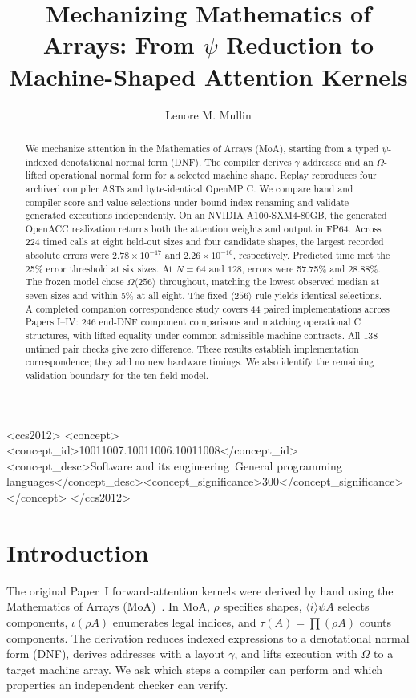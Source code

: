 \documentclass[sigplan,10pt,review,balance=false,pbalance=false]{acmart}
\title{Mechanizing Mathematics of Arrays: From \texorpdfstring{$\psi$}{Psi} Reduction to Machine-Shaped Attention Kernels}
\author{Lenore M. Mullin}
\affiliation{\department{College of Nanotechnology, Science and Engineering}\institution{University at Albany, SUNY}\city{Albany}\state{New York}\country{USA}}
\begin{document}
\begin{abstract}
We mechanize attention in the Mathematics of Arrays (MoA), starting from a typed $\psi$-indexed denotational normal form (DNF). The compiler derives $\gamma$ addresses and an $\Omega$-lifted operational normal form for a selected machine shape. Replay reproduces four archived compiler ASTs and byte-identical OpenMP C. We compare hand and compiler score and value selections under bound-index renaming and validate generated executions independently. On an NVIDIA A100-SXM4-80GB, the generated OpenACC realization returns both the attention weights and output in FP64. Across 224 timed calls at eight held-out sizes and four candidate shapes, the largest recorded absolute errors were $2.78\times10^{-17}$ and $2.26\times10^{-16}$, respectively. Predicted time met the 25\% error threshold at six sizes. At $N=64$ and $128$, errors were 57.75\% and 28.88\%. The frozen model chose $\Omega\langle256\rangle$ throughout, matching the lowest observed median at seven sizes and within 5\% at all eight. The fixed $\langle256\rangle$ rule yields identical selections. A completed companion correspondence study covers 44 paired implementations across Papers I--IV: 246 end-DNF component comparisons and matching operational C structures, with lifted equality under common admissible machine contracts. All 138 untimed pair checks give zero difference. These results establish implementation correspondence; they add no new hardware timings. We also identify the remaining validation boundary for the ten-field model.
\end{abstract}
\begin{CCSXML}
<ccs2012>
 <concept><concept_id>10011007.10011006.10011008</concept_id><concept_desc>Software and its engineering~General programming languages</concept_desc><concept_significance>300</concept_significance></concept>
</ccs2012>
\end{CCSXML}
\maketitle
\thispagestyle{plain}
\pagestyle{plain}
\section{Introduction}
The original Paper~I forward-attention kernels were derived by hand using the Mathematics of Arrays (MoA)~\cite{paperI,moa}. In MoA, $\rho$ specifies shapes, $\langle i\rangle\psi A$ selects components, $\iota(\rho A)$ enumerates legal indices, and $\tau(A)=\prod(\rho A)$ counts components. The derivation reduces indexed expressions to a denotational normal form (DNF), derives addresses with a layout $\gamma$, and lifts execution with $\Omega$ to a target machine array. We ask which steps a compiler can perform and which properties an independent checker can verify.
\end{document}
